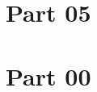 \documentclass[letterpaper,11pt]{exam}
\begin{document}
\section*{Part 05}
   
\section*{Part 00}
   
\end{document}
